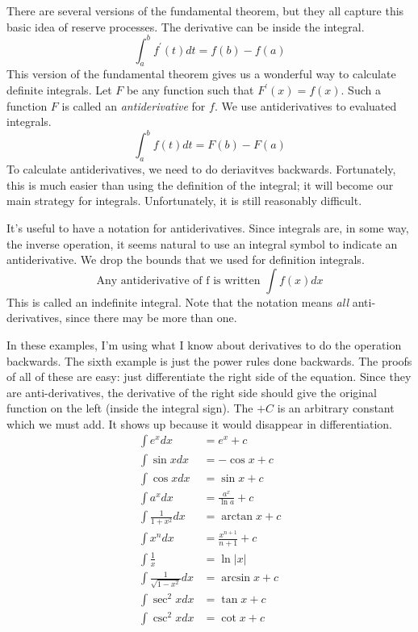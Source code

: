 \documentclass[fleqn]{report}
\begin{document}
There are several versions of the fundamental theorem, but
they all capture this basic idea of reserve processes. The
derivative can be inside the integral.
\begin{equation*}
\int_a^b f^\prime(t) dt = f(b) - f(a) 
\end{equation*}
This version of the fundamental theorem gives us a wonderful
way to calculate definite integrals. Let $F$ be any function
such that $F^\prime(x) = f(x)$. Such a function $F$ is called an
\emph{antiderivative} for $f$. We use antiderivatives to
evaluated integrals.
\begin{equation*}
\int_a^b f(t) dt = F(b) - F(a) 
\end{equation*}
To calculate antiderivatives, we need to do deriavitves
backwards. Fortunately, this is much easier than using the
definition of the integral; it will become our main strategy
for integrals. Unfortunately, it is still reasonably
difficult.

It's useful to have a notation for antiderivatives. Since
integrals are, in some way, the inverse operation, it seems
natural to use an integral symbol to indicate an
antiderivative. We drop the bounds that we used for
definition integrals.
\begin{equation*}
\text{Any antiderivative of f is written } \int f(x) dx
\end{equation*} 
This is called an indefinite integral. Note that the notation
means \emph{all} anti-derivatives, since there may be more
than one.

\begin{example}
In these examples, I'm using what I
know about derivatives to do the operation backwards. 
The sixth example is just the power rules done
backwards. The proofs of all of these are easy: just
differentiate the right side of the equation. Since they are
anti-derivatives, the derivative of the right side should give
the original function on the left (inside the integral sign).
The $+C$ is an arbitrary constant which we must add. It shows
up because it would disappear in differentiation.
\begin{align*}
\int e^x dx & = e^x + c \\
\int \sin x dx & = -\cos x + c \\
\int \cos x dx & = \sin x + c \\
\int a^x dx & = \frac{a^x}{\ln a} + c \\
\int \frac{1}{1+x^2} dx & = \arctan x + c \\
\int x^n dx & = \frac{x^{n+1}}{n+1} + c \\
\int \frac{1}{x} & = \ln |x| \\
\int \frac{1}{\sqrt{1-x^2}} dx & = \arcsin x + c \\
\int \sec^2 x dx & = \tan x + c \\
\int \csc^2 x dx & = \cot x + c 
\end{align*}
\end{example}
\end{document}
